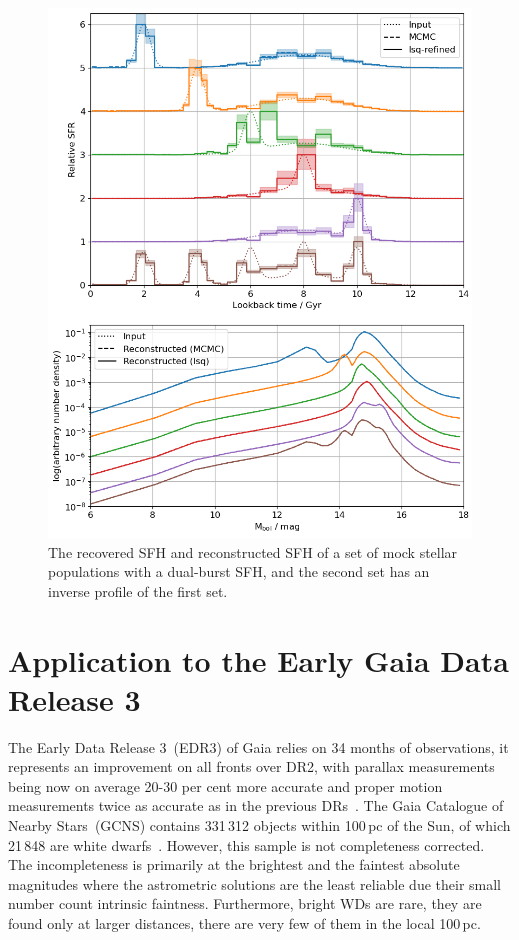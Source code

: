 \documentclass[fleqn,usenatbib]{mnras}
\begin{document}
\begin{figure}
  \includegraphics[width=\columnwidth]{figures/fig_02_two_bursts_wdlf.png} 
  \caption{The recovered SFH and reconstructed SFH of a set of mock stellar
  populations with a dual-burst SFH, and the second set has an inverse profile
  of the first set.}
  \label{fig:bursts_sfh}
\end{figure}


\section{Application to the Early Gaia Data Release 3}
The Early Data Release 3~(EDR3) of Gaia relies on 34 months of observations, it
represents an improvement on all fronts over DR2, with parallax measurements
being now on average 20-30 per cent more accurate and proper motion measurements
twice as accurate as in the previous
DRs~\citep{2021A&A...649A...1G, 2021A&A...649A...2L}. The Gaia Catalogue of
Nearby Stars~(GCNS) contains 331\,312 objects within 100\,pc of the Sun, of
which 21\,848 are white dwarfs~\citep{2021A&A...649A...6G}. However, this sample
is not completeness corrected. The incompleteness is primarily at the brightest
and the faintest absolute magnitudes where the astrometric solutions are the
least reliable due their small number count intrinsic faintness. Furthermore,
bright WDs are rare, they are found only at larger distances, there are very
few of them in the local 100\,pc.
\end{document}
